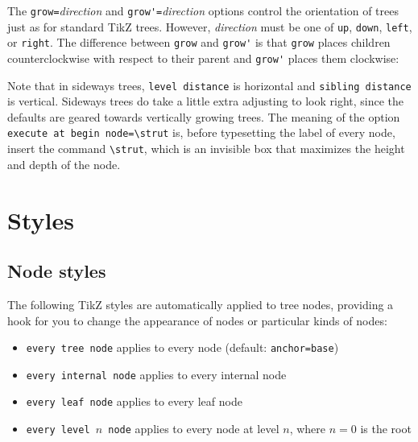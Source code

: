 \documentclass{article}
\begin{document}
The \verb|grow=|\textit{direction}\/ and \verb|grow'=|\textit{direction}\/ options control the orientation of trees just as for standard TikZ trees. However, \textit{direction}\/ must be one of \verb|up|, \verb|down|, \verb|left|, or \verb|right|. The difference between \verb|grow| and \verb|grow'| is that \verb|grow| places children counterclockwise with respect to their parent and \verb|grow'| places them clockwise:
\begin{center}
\begin{SideBySideExample}
%
\end{SideBySideExample}
\vspace{3ex}
\begin{SideBySideExample}
\end{SideBySideExample}
\end{center}
Note that in sideways trees, \verb|level distance| is horizontal and \verb|sibling distance| is vertical. Sideways trees do take a little extra adjusting to look right, since the defaults are geared towards vertically growing trees. The meaning of the option \verb|execute at begin node=\strut| is, before typesetting the label of every node, insert the command \verb|\strut|, which is an invisible box that maximizes the height and depth of the node.

\section{Styles} 

\subsection{Node styles}

The following TikZ styles are automatically applied to tree nodes,
providing a hook for you to change the appearance of nodes or particular kinds of nodes:
\begin{itemize}
\item \verb|every tree node| applies to every node (default: \verb|anchor=base|)
\item \verb|every internal node| applies to every internal node
\item \verb|every leaf node| applies to every leaf node
\item \texttt{every level $n$ node} applies to every node at level $n$, where $n=0$ is the root
\end{itemize}
\end{document}
